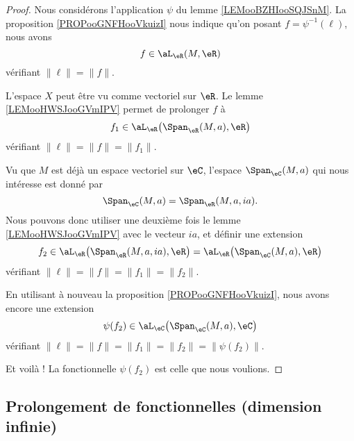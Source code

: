 \begin{proof}
    Nous considérons l'application \( \psi\) du lemme \ref{LEMooBZHIooSQJSnM}. La proposition \ref{PROPooGNFHooVkuizI} nous indique qu'on posant \( f=\psi^{-1}(\ell)\), nous avons
    \begin{equation}
        f\in\aL_{\eR}(M,\eR)
    \end{equation}
    vérifiant \( \| \ell \|=\| f \|\).

    L'espace \( X\) peut être vu comme vectoriel sur \( \eR\). Le lemme \ref{LEMooHWSJooGVmIPV} permet de prolonger \( f\) à
    \begin{equation}
        f_1\in\aL_{\eR}\big( \Span_{\eR}(M,a),\eR \big)
    \end{equation}
    vérifiant \( \| \ell \|=\| f \|=\| f_1 \|\).

    Vu que \( M\) est déjà un espace vectoriel sur \( \eC\), l'espace \( \Span_{\eC}(M,a)\) qui nous intéresse est donné par
    \begin{equation}
        \Span_{\eC}(M,a)=\Span_{\eR}(M,a,ia).
    \end{equation}
    Nous pouvons donc utiliser une deuxième fois le lemme \ref{LEMooHWSJooGVmIPV} avec le vecteur \( ia\), et définir une extension
    \begin{equation}
        f_2\in\aL_{\eR}\big( \Span_{\eR}(M,a,ia),\eR \big)=\aL_{\eR}\big( \Span_{\eC}(M,a),\eR \big)
    \end{equation}
    vérifiant \( \| \ell \|=\| f \|=\| f_1 \|=\| f_2 \|\).

    En utilisant à nouveau la proposition \ref{PROPooGNFHooVkuizI}, nous avons encore une extension
    \begin{equation}
        \psi(f_2)\in\aL_{\eC}\big( \Span_{\eC}(M,a),\eC \big)
    \end{equation}
    vérifiant \( \| \ell \|=\| f \|=\| f_1 \|=\| f_2 \|=\| \psi(f_2) \|\).

    Et voilà ! La fonctionnelle \( \psi(f_2)\) est celle que nous voulions.
\end{proof}

\subsection{Prolongement de fonctionnelles (dimension infinie)}

